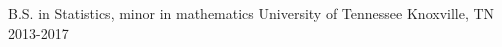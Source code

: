 \begin{cventries}
  \cventry
    {B.S. in Statistics, minor in mathematics}
    {University of Tennessee}
    {Knoxville, TN}
    {2013-2017}
    {}
\end{cventries}
